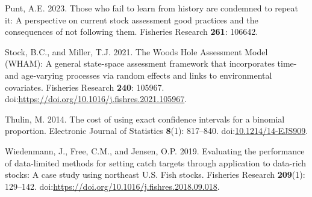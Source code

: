 \documentclass[
  12pt,
]{article}
\newlength{\cslhangindent}
\newlength{\cslentryspacingunit} %
\newenvironment{CSLReferences}[2] %
 {%
  \setlength{\parindent}{0pt}
  \ifodd #1
  \let\oldpar\par
  \def\par{\hangindent=\cslhangindent\oldpar}
  \fi
  \setlength{\parskip}{#2\cslentryspacingunit}
 }%
 {}
\begin{document}
\begin{CSLReferences}{1}{0}
\leavevmode{}%
Punt, A.E. 2023. Those who fail to learn from history are condemned to
repeat it: A perspective on current stock assessment good practices and
the consequences of not following them. Fisheries Research \textbf{261}:
106642.

\leavevmode{}%
Stock, B.C., and Miller, T.J. 2021. The {W}oods {H}ole {A}ssessment
{M}odel ({WHAM}): {A} general state-space assessment framework that
incorporates time- and age-varying processes via random effects and
links to environmental covariates. Fisheries Research \textbf{240}:
105967. doi:\url{https://doi.org/10.1016/j.fishres.2021.105967}.

\leavevmode{}%
Thulin, M. 2014. {The cost of using exact confidence intervals for a
binomial proportion}. Electronic Journal of Statistics \textbf{8}(1):
817--840.
doi:\href{https://doi.org/10.1214/14-EJS909}{10.1214/14-EJS909}.

\leavevmode{}%
Wiedenmann, J., Free, C.M., and Jensen, O.P. 2019. Evaluating the
performance of data-limited methods for setting catch targets through
application to data-rich stocks: A case study using northeast {U.S.}
Fish stocks. Fisheries Research \textbf{209}(1): 129--142.
doi:\url{https://doi.org/10.1016/j.fishres.2018.09.018}.

\end{CSLReferences}

\pagebreak
\end{document}
